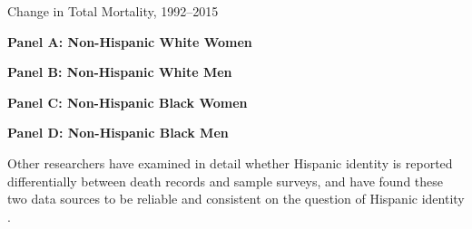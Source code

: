\begin{table}[H]
\caption{Change in Total Mortality, 1992--2015}
\label{tab:all_mort}
\begin{center}
\textbf{Panel A: Non-Hispanic White Women} 
\end{center}
\begin{center}
\small{} 
\end{center}
\begin{center}
\textbf{Panel B: Non-Hispanic White Men} 
\end{center}
\begin{center}
\small{}
\end{center} 
\begin{center}
\textbf{Panel C: Non-Hispanic Black Women} 
\end{center}
\begin{center}
\small{}
\end{center}
\begin{center}
\textbf{Panel D: Non-Hispanic Black Men} 
\end{center}
\begin{center}
\small{}
\end{center}
\end{table}




Other researchers have examined in detail whether Hispanic identity is
reported differentially between death records and sample surveys, and
have found these two data sources to be reliable and consistent on the
question of Hispanic identity .
